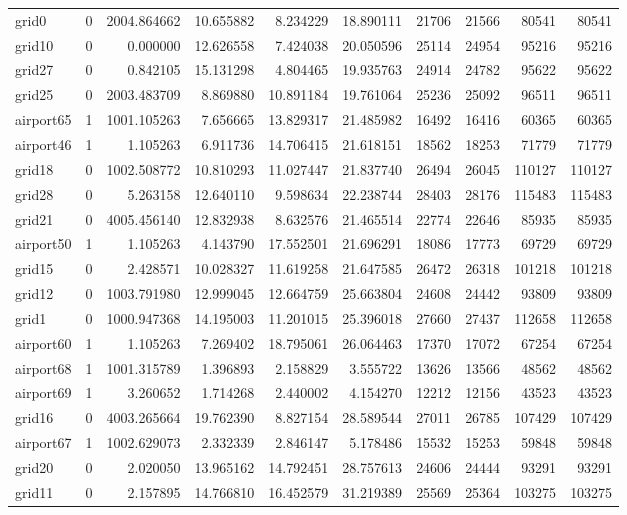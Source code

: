 \begin{longtable}{|l|r|r|r|r|r|r|r|r|r|}
grid0 & 0 & 2004.864662 & 10.655882 & 8.234229 & 18.890111 & 21706 & 21566 & 80541 & 80541 \\
grid10 & 0 & 0.000000 & 12.626558 & 7.424038 & 20.050596 & 25114 & 24954 & 95216 & 95216 \\
grid27 & 0 & 0.842105 & 15.131298 & 4.804465 & 19.935763 & 24914 & 24782 & 95622 & 95622 \\
grid25 & 0 & 2003.483709 & 8.869880 & 10.891184 & 19.761064 & 25236 & 25092 & 96511 & 96511 \\
airport65 & 1 & 1001.105263 & 7.656665 & 13.829317 & 21.485982 & 16492 & 16416 & 60365 & 60365 \\
airport46 & 1 & 1.105263 & 6.911736 & 14.706415 & 21.618151 & 18562 & 18253 & 71779 & 71779 \\
grid18 & 0 & 1002.508772 & 10.810293 & 11.027447 & 21.837740 & 26494 & 26045 & 110127 & 110127 \\
grid28 & 0 & 5.263158 & 12.640110 & 9.598634 & 22.238744 & 28403 & 28176 & 115483 & 115483 \\
grid21 & 0 & 4005.456140 & 12.832938 & 8.632576 & 21.465514 & 22774 & 22646 & 85935 & 85935 \\
airport50 & 1 & 1.105263 & 4.143790 & 17.552501 & 21.696291 & 18086 & 17773 & 69729 & 69729 \\
grid15 & 0 & 2.428571 & 10.028327 & 11.619258 & 21.647585 & 26472 & 26318 & 101218 & 101218 \\
grid12 & 0 & 1003.791980 & 12.999045 & 12.664759 & 25.663804 & 24608 & 24442 & 93809 & 93809 \\
grid1 & 0 & 1000.947368 & 14.195003 & 11.201015 & 25.396018 & 27660 & 27437 & 112658 & 112658 \\
airport60 & 1 & 1.105263 & 7.269402 & 18.795061 & 26.064463 & 17370 & 17072 & 67254 & 67254 \\
airport68 & 1 & 1001.315789 & 1.396893 & 2.158829 & 3.555722 & 13626 & 13566 & 48562 & 48562 \\
airport69 & 1 & 3.260652 & 1.714268 & 2.440002 & 4.154270 & 12212 & 12156 & 43523 & 43523 \\
grid16 & 0 & 4003.265664 & 19.762390 & 8.827154 & 28.589544 & 27011 & 26785 & 107429 & 107429 \\
airport67 & 1 & 1002.629073 & 2.332339 & 2.846147 & 5.178486 & 15532 & 15253 & 59848 & 59848 \\
grid20 & 0 & 2.020050 & 13.965162 & 14.792451 & 28.757613 & 24606 & 24444 & 93291 & 93291 \\
grid11 & 0 & 2.157895 & 14.766810 & 16.452579 & 31.219389 & 25569 & 25364 & 103275 & 103275 \\

\end{longtable}
